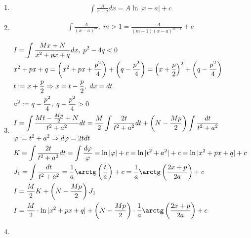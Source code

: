 \documentclass{article}
\begin{document}

\begin{enumerate}
	\item{}
	\begin{align*}
		\int \frac{A}{x-a}dx=A\ln|x-a|+c
	\end{align*}
	\item{}
	\begin{align*}
		\int \frac{A}{(x-a)^{m}},\;m>1=\frac{-A}{(m-1)(x-a)^{m-1}}+c
	\end{align*}
	\item{}
	\begin{align*}
		 & I=\int \frac{Mx+N}{x^{2}+px+q}dx,\;p^{2}-4q<0                                                                                                   \\
		 & x^{2}+px+q=\left(x^{2}+px+\frac{p^{2}}{4}\right)+\left(q-\frac{p^{2}}{4}\right)=\left(x+\frac{p}{2}\right)^{2}+\left(q-\frac{p^{2}}{4}\right)   \\
		 & t:=x+\frac{p}{2}\Rarr x=t-\frac{p}{2},\;dx=dt                                                                                                   \\
		 & a^{2}:=q-\frac{p^{2}}{4},\;q-\frac{p^{2}}{4}>0                                                                                                  \\
		 & I=\int \frac{Mt - \frac{Mp}{2}+N}{t^{2}+a^{2}}dt=\frac{M}{2}\int \frac{2t}{t^{2}+a^{2}}dt+\left(N-\frac{Mp}{2}\right)\int\frac{dt}{t^{2}+a^{2}} \\
		 & \varphi:=t^{2}+a^{2}\Rarr d\varphi=2tdt                                                                                                         \\
		 & K=\int \frac{2t}{t^{2}+a^{2}}dt=\int\frac{d\varphi}{\varphi}=\ln|\varphi|+c=\ln|t^{2}+a^{2}|+c=\ln|x^{2}+px+q|+c                                \\
		 & J_1=\int\frac{dt}{t^{2}+a^{2}}=\frac{1}{a}\arctg\left(\frac{t}{a}\right)+c=\frac{1}{a}\arctg\left(\frac{2x+p}{2a}\right)+c                      \\
		 & I=\frac{M}{2}K+\left(N-\frac{Mp}{2}\right)J_1                                                                                                   \\
		 & I = \frac{M}{2} \cdot \ln|x^{2}+px+q| + \left(N-\frac{Mp}{2}\right) \cdot \frac{1}{a}\arctg\left(\frac{2x+p}{2a}\right)+c
	\end{align*}
	\item{}

\end{enumerate}
\end{document}
